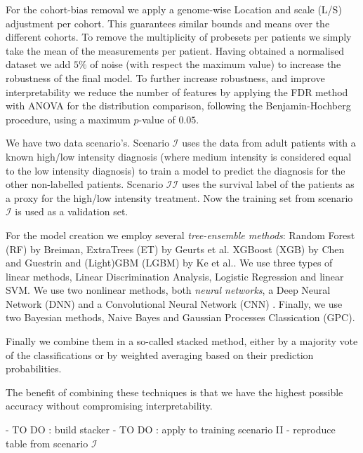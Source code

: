 For the cohort-bias removal we apply a genome-wise Location and scale (L/S) adjustment per cohort. This guarantees
similar bounds and means over the different cohorts. To remove the multiplicity of probesets per patients
we simply take the mean of the measurements per patient. Having obtained a normalised dataset we add $5\%$
of noise (with respect the maximum value) to increase the robustness of the final model. To further increase robustness, and improve 
interpretability we reduce the number of features by applying the FDR method with ANOVA for the distribution comparison, 
following the Benjamin-Hochberg procedure, using a maximum $p$-value of $0.05$. 

We have two data scenario's. Scenario $\mathcal{I}$ uses the data from adult patients with a known high/low intensity diagnosis (where 
medium intensity is considered equal to the low intensity diagnosis) to train a model to predict the diagnosis for the other non-labelled patients.
Scenario $\mathcal{II}$ uses the survival label of the patients as a proxy for the high/low intensity treatment. Now the training set from scenario
$\mathcal{I}$ is used as a validation set.

For the model creation we employ several \textit{tree-ensemble methods}: Random Forest (RF) by Breiman\cite{Breiman2001}, ExtraTrees (ET) by Geurts et al.\cite{Geurts2006} 
XGBoost (XGB) by Chen and Guestrin\cite{Chen2016} and (Light)GBM (LGBM) by Ke et al.\cite{Ke2017}. 
We use three types of linear methods, Linear Discrimination Analysis, Logistic Regression and linear SVM.
We use two nonlinear methods, both \textit{neural networks}, a Deep Neural Network (DNN) \cite{lecun2015deep} and a Convolutional Neural Network (CNN) \cite{Lecun98}.
Finally, we use two Bayesian methods, Naive Bayes and Gaussian Processes Classication (GPC).

Finally we combine them in a so-called stacked method, either by a majority vote of the classifications or by weighted averaging based on their prediction probabilities.

The benefit of combining these techniques is that we have the highest possible accuracy without compromising interpretability.

- TO DO : build stacker
- TO DO : apply to training scenario II
- reproduce table from scenario $\mathcal{I}$